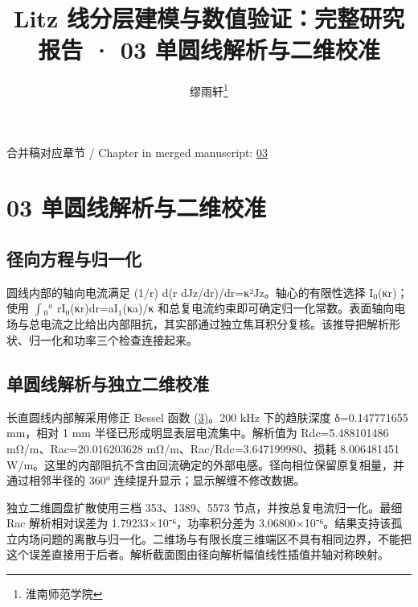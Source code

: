 \documentclass[journal,10pt]{IEEEtran}
\begin{document}
\title{Litz 线分层建模与数值验证：完整研究报告 · 03 单圆线解析与二维校准}
\author{缪雨轩\thanks{淮南师范学院}}

\maketitle
\noindent 合并稿对应章节 / Chapter in merged manuscript: \href{report_zh-CN_ieee.pdf#chapter-03}{03}\par
\FloatBarrier
\section*{03 单圆线解析与二维校准}
\hypertarget{chapter-03}{}
\subsection*{径向方程与归一化}
\hypertarget{03.round_derivation.heading}{}
圆线内部的轴向电流满足 (1/r) d(r dJz/dr)/dr=κ²Jz。轴心的有限性选择 I\(_0\)(κr)；使用 \(\int\)\(_0\)\(^a\) rI\(_0\)(κr)dr=aI\(_1\)(κa)/κ 和总复电流约束即可确定归一化常数。表面轴向电场与总电流之比给出内部阻抗，其实部通过独立焦耳积分复核。该推导把解析形状、归一化和功率三个检查连接起来。


\subsection*{单圆线解析与独立二维校准}
\hypertarget{03.analytic.heading}{}
长直圆线内部解采用修正 Bessel 函数 \href{report_zh-CN_ieee.pdf#E03}{(3)}。200 kHz 下的趋肤深度 δ=0.147771655 mm，相对 1 mm 半径已形成明显表层电流集中。解析值为 Rdc=5.488101486 mΩ/m、Rac=20.016203628 mΩ/m、Rac/Rdc=3.647199980、损耗 8.006481451 W/m。这里的内部阻抗不含由回流确定的外部电感。径向相位保留原复相量，并通过相邻半径的 360° 连续提升显示；显示解缠不修改数据。


独立二维圆盘扩散使用三档 353、1389、5573 节点，并按总复电流归一化。最细 Rac 解析相对误差为 1.79233×10⁻⁶，功率积分差为 3.06800×10⁻⁶。结果支持该孤立内场问题的离散与归一化。二维场与有限长度三维端区不具有相同边界，不能把这个误差直接用于后者。解析截面图由径向解析幅值线性插值并轴对称映射。
\end{document}
